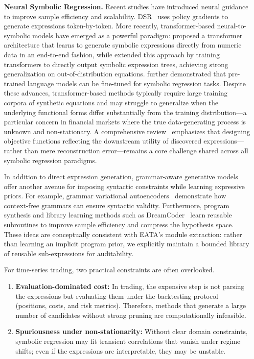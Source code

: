 \textbf{Neural Symbolic Regression.} Recent studies have introduced neural guidance to improve sample efficiency and scalability. DSR~\cite{petersen2021deep} uses policy gradients to generate expressions token-by-token. More recently, transformer-based neural-to-symbolic models have emerged as a powerful paradigm: \cite{biggio2021neural} proposed a transformer architecture that learns to generate symbolic expressions directly from numeric data in an end-to-end fashion, while \cite{kamienny2022end} extended this approach by training transformers to directly output symbolic expression trees, achieving strong generalization on out-of-distribution equations. \cite{valipour2021symbolicgpt} further demonstrated that pre-trained language models can be fine-tuned for symbolic regression tasks. Despite these advances, transformer-based methods typically require large training corpora of synthetic equations and may struggle to generalize when the underlying functional forms differ substantially from the training distribution---a particular concern in financial markets where the true data-generating process is unknown and non-stationary. A comprehensive review~\cite{makke2024interpretable} emphasizes that designing objective functions reflecting the downstream utility of discovered expressions---rather than mere reconstruction error---remains a core challenge shared across all symbolic regression paradigms.

In addition to direct expression generation, grammar-aware generative models offer another avenue for imposing syntactic constraints while learning expressive priors. For example, grammar variational autoencoders~\cite{kusner2017grammar} demonstrate how context-free grammars can ensure syntactic validity. Furthermore, program synthesis and library learning methods such as DreamCoder~\cite{ellis2021dreamcoder} learn reusable subroutines to improve sample efficiency and compress the hypothesis space. These ideas are conceptually consistent with EATA's module extraction: rather than learning an implicit program prior, we explicitly maintain a bounded library of reusable sub-expressions for auditability.

For time-series trading, two practical constraints are often overlooked.
\begin{enumerate}
    \item \textbf{Evaluation-dominated cost:} In trading, the expensive step is not parsing the expressions but evaluating them under the backtesting protocol (positions, costs, and risk metrics). Therefore, methods that generate a large number of candidates without strong pruning are computationally infeasible.
    \item \textbf{Spuriousness under non-stationarity:} Without clear domain constraints, symbolic regression may fit transient correlations that vanish under regime shifts; even if the expressions are interpretable, they may be unstable.
\end{enumerate}

